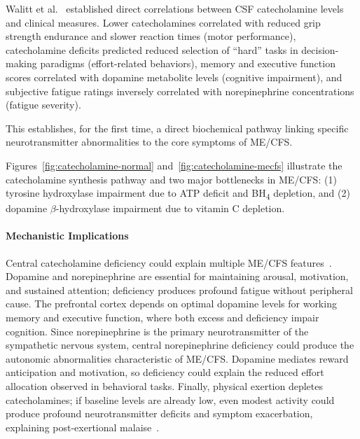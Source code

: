 \begin{observation}
\label{obs:catecholamine-symptoms}
Walitt et al.~\cite{walitt2024deep} established direct correlations between CSF catecholamine levels and clinical measures. Lower catecholamines correlated with reduced grip strength endurance and slower reaction times (motor performance), catecholamine deficits predicted reduced selection of ``hard'' tasks in decision-making paradigms (effort-related behaviors), memory and executive function scores correlated with dopamine metabolite levels (cognitive impairment), and subjective fatigue ratings inversely correlated with norepinephrine concentrations (fatigue severity).

This establishes, for the first time, a direct biochemical pathway linking specific neurotransmitter abnormalities to the core symptoms of ME/CFS.
\end{observation}





Figures~\ref{fig:catecholamine-normal} and~\ref{fig:catecholamine-mecfs} illustrate the catecholamine synthesis pathway and two major bottlenecks in ME/CFS: (1) tyrosine hydroxylase impairment due to ATP deficit and BH\textsubscript{4} depletion, and (2) dopamine $\beta$-hydroxylase impairment due to vitamin C depletion.

\paragraph{Mechanistic Implications}
Central catecholamine deficiency could explain multiple ME/CFS features~\cite{walitt2024deep}. Dopamine and norepinephrine are essential for maintaining arousal, motivation, and sustained attention; deficiency produces profound fatigue without peripheral cause. The prefrontal cortex depends on optimal dopamine levels for working memory and executive function, where both excess and deficiency impair cognition. Since norepinephrine is the primary neurotransmitter of the sympathetic nervous system, central norepinephrine deficiency could produce the autonomic abnormalities characteristic of ME/CFS. Dopamine mediates reward anticipation and motivation, so deficiency could explain the reduced effort allocation observed in behavioral tasks. Finally, physical exertion depletes catecholamines; if baseline levels are already low, even modest activity could produce profound neurotransmitter deficits and symptom exacerbation, explaining post-exertional malaise~\cite{walitt2024deep}.

